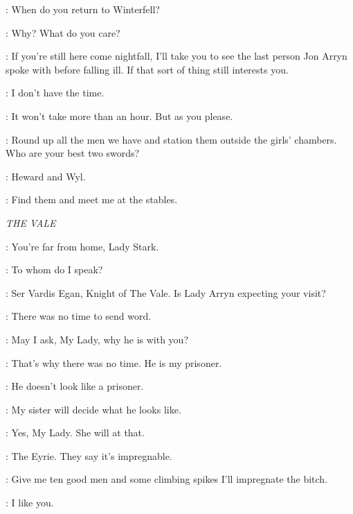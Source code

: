 \LITTLEFINGER: When do you return to Winterfell? 

\NED: Why? What do you care? 

\LITTLEFINGER: If you're still here come nightfall, I'll take you to see the last person Jon Arryn spoke with before falling ill. If that sort of thing still interests you. 

\NED: I don't have the time. 

\LITTLEFINGER: It won't take more than an hour. But as you please. 


\NED: Round up all the men we have and station them outside the girls' chambers. Who are your best two swords? 

\JORY: Heward and Wyl. 

\NED: Find them and meet me at the stables. 



\scene

\textit{THE VALE} 


\VARDIS: You're far from home, Lady Stark. 

\CATELYN: To whom do I speak? 

\VARDIS: Ser Vardis Egan, Knight of The Vale. Is Lady Arryn expecting your visit? 

\CATELYN: There was no time to send word. 

\VARDIS: May I ask, My Lady, why he is with you? 

\CATELYN: That's why there was no time. He is my prisoner. 

\VARDIS: He doesn't look like a prisoner. 

\CATELYN: My sister will decide what he looks like. 

\VARDIS: Yes, My Lady. She will at that. 


\TYRION: The Eyrie. They say it's impregnable. 

\BRONN: Give me ten good men and some climbing spikes I'll impregnate the bitch. 

\TYRION: I like you. 

